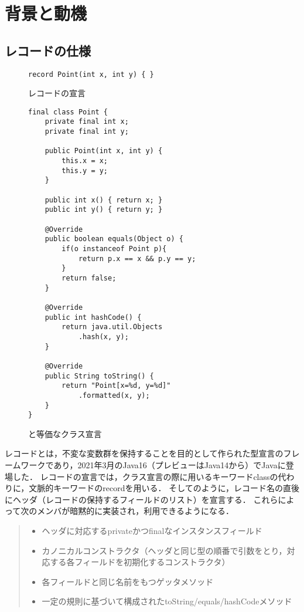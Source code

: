 \section{背景と動機\label{motivation}}

\subsection{レコードの仕様\label{record_specification}}

\begin{figure}[t]
\begin{lstlisting}
record Point(int x, int y) { }
\end{lstlisting}
\caption{レコードの宣言}
\label{record_decl}
\end{figure}

\begin{figure}[t]
\begin{lstlisting}
final class Point {
    private final int x;
    private final int y;

    public Point(int x, int y) {
        this.x = x;
        this.y = y;
    }

    public int x() { return x; }
    public int y() { return y; }

    @Override
    public boolean equals(Object o) {
        if(o instanceof Point p){
            return p.x == x && p.y == y;
        }
        return false;
    }

    @Override
    public int hashCode() {
        return java.util.Objects
            .hash(x, y);
    }

    @Override
    public String toString() {
        return "Point[x=%d, y=%d]"
            .formatted(x, y);
    }
}
\end{lstlisting}
\caption{と等価なクラス宣言}
\label{class_decl}
\end{figure}

レコードとは，不変な変数群を保持することを目的として作られた型宣言のフレームワークであり，2021年3月のJava16（プレビューはJava14から）でJavaに登場した\cite{Record_Purpose}．
レコードの宣言では，クラス宣言の際に用いるキーワードclassの代わりに，文脈的キーワードのrecordを用いる．
そしてのように，レコード名の直後にヘッダ（レコードの保持するフィールドのリスト）を宣言する．
これらによって次のメンバが暗黙的に実装され，利用できるようになる．

\begin{quote}
    \begin{itemize}
        \item ヘッダに対応するprivateかつfinalなインスタンスフィールド
        \item カノニカルコンストラクタ（ヘッダと同じ型の順番で引数をとり，対応する各フィールドを初期化するコンストラクタ）
        \item 各フィールドと同じ名前をもつゲッタメソッド
        \item 一定の規則に基づいて構成されたtoString/equals/hashCodeメソッド
    \end{itemize}
\end{quote}


